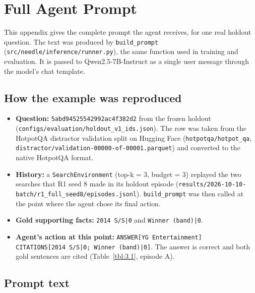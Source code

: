 \chapter{Full Agent Prompt}\label{sec:A}

This appendix gives the complete prompt the agent receives, for one real
holdout question. The text was produced by
\texttt{build\_\allowbreak{}prompt}
(\texttt{src/\allowbreak{}needle/\allowbreak{}inference/\allowbreak{}runner.\allowbreak{}py}),
the same function used in training and evaluation. It is passed to
Qwen2.5-7B-Instruct as a single user message through the model's chat
template.

\section{How the example was
reproduced}\label{how-the-example-was-reproduced}

\begin{itemize}
\tightlist
\item
  \textbf{Question:} \texttt{5abd94525542992ac4f382d2} from the frozen
  holdout
  (\texttt{configs/\allowbreak{}evaluation/\allowbreak{}holdout\_\allowbreak{}v1\_\allowbreak{}ids.\allowbreak{}json}).
  The row was taken from the HotpotQA distractor validation split on
  Hugging Face (\texttt{hotpotqa/\allowbreak{}hotpot\_\allowbreak{}qa},
  \texttt{distractor/\allowbreak{}validation-\allowbreak{}00000-\allowbreak{}of-\allowbreak{}00001.\allowbreak{}parquet})
  and converted to the native HotpotQA format.
\item
  \textbf{History:} a \texttt{SearchEnvironment} (top-k = 3, budget = 3)
  replayed the two searches that R1 seed 8 made in its holdout episode
  (\texttt{results/\allowbreak{}2026-\allowbreak{}10-\allowbreak{}10-\allowbreak{}batch/\allowbreak{}r1\_\allowbreak{}full\_\allowbreak{}seed8/\allowbreak{}episodes.\allowbreak{}jsonl}).
  \texttt{build\_\allowbreak{}prompt} was then called at the point where
  the agent chose its final action.
\item
  \textbf{Gold supporting facts:} \texttt{2014 S/\allowbreak{}S|0} and
  \texttt{Winner (band)|0}.
\item
  \textbf{Agent's action at this point:}
  \texttt{ANSWER{[}YG Entertainment{]} CITATIONS{[}2014 S/\allowbreak{}S|0; Winner (band)|0{]}}.
  The answer is correct and both gold sentences are cited
  (Table~\ref{tbl:3.1}, episode A).
\end{itemize}

\section{Prompt text}\label{prompt-text}

